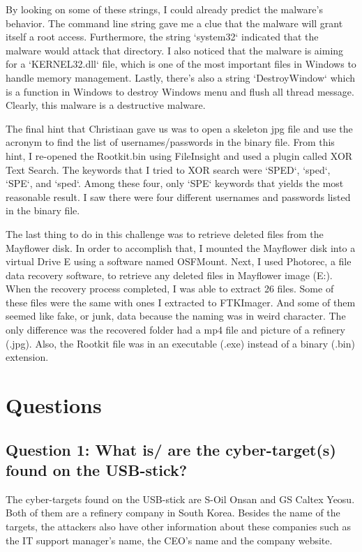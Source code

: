 \documentclass[letterpaper,10pt,titlepage,draftclsnofoot,onecolumn]{IEEEtran}
\begin{document}
By looking on some of these strings, I could already predict the malware's behavior.
The command line string gave me a clue that the malware will grant itself a root access. 
Furthermore, the string `system32` indicated that the malware would attack that directory. 
I also noticed that the malware is aiming for a `KERNEL32.dll` file, which is one of the most important files in Windows to handle memory management.
Lastly, there's also a string `DestroyWindow` which is a function in Windows to destroy Windows menu and flush all thread message. 
Clearly, this malware is a destructive malware.

The final hint that Christiaan gave us was to open a skeleton jpg file and use the acronym to find the list of usernames/passwords in the binary file. 
From this hint, I re-opened the Rootkit.bin using FileInsight and used a plugin called XOR Text Search.
The keywords that I tried to XOR search were `SPED`, `sped`, `SPE`, and `sped`. 
Among these four, only `SPE` keywords that yields the most reasonable result. 
I saw there were four different usernames and passwords listed in the binary file.

The last thing to do in this challenge was to retrieve deleted files from the Mayflower disk.
In order to accomplish that, I mounted the Mayflower disk into a virtual Drive E using a software named OSFMount. 
Next, I used Photorec, a file data recovery software, to retrieve any deleted files in Mayflower image (E:).
When the recovery process completed, I was able to extract 26 files.
Some of these files were the same with ones I extracted to FTKImager. And some of them seemed like fake, or junk, data because the naming was in weird character.     
The only difference was the recovered folder had a mp4 file and picture of a refinery (.jpg).
Also, the Rootkit file was in an executable (.exe) instead of a binary (.bin) extension.


\section{Questions}

\subsection{Question 1: What is/ are the cyber-target(s) found on the USB-stick?}

The cyber-targets found on the USB-stick are S-Oil Onsan and GS Caltex Yeosu. 
Both of them are a refinery company in South Korea. 
Besides the name of the targets, the attackers also have other information about these companies such as the IT support manager's name, the CEO's name and the company website. 
\end{document}
